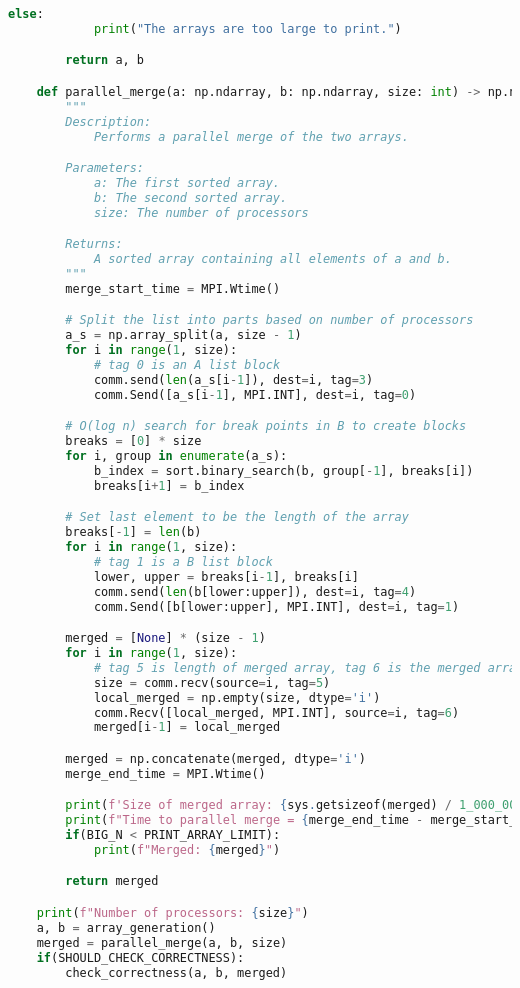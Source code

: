 \documentclass[12pt]{article}
\begin{document}
{\begin{lstlisting}[language={Python}]
        else:
            print("The arrays are too large to print.")

        return a, b

    def parallel_merge(a: np.ndarray, b: np.ndarray, size: int) -> np.ndarray:
        """
        Description:
            Performs a parallel merge of the two arrays.

        Parameters:
            a: The first sorted array.
            b: The second sorted array.
            size: The number of processors

        Returns:
            A sorted array containing all elements of a and b.
        """
        merge_start_time = MPI.Wtime()

        # Split the list into parts based on number of processors
        a_s = np.array_split(a, size - 1)
        for i in range(1, size):
            # tag 0 is an A list block
            comm.send(len(a_s[i-1]), dest=i, tag=3)
            comm.Send([a_s[i-1], MPI.INT], dest=i, tag=0)

        # O(log n) search for break points in B to create blocks
        breaks = [0] * size
        for i, group in enumerate(a_s):
            b_index = sort.binary_search(b, group[-1], breaks[i])
            breaks[i+1] = b_index

        # Set last element to be the length of the array
        breaks[-1] = len(b)
        for i in range(1, size):
            # tag 1 is a B list block
            lower, upper = breaks[i-1], breaks[i]
            comm.send(len(b[lower:upper]), dest=i, tag=4)
            comm.Send([b[lower:upper], MPI.INT], dest=i, tag=1)

        merged = [None] * (size - 1)
        for i in range(1, size):
            # tag 5 is length of merged array, tag 6 is the merged array
            size = comm.recv(source=i, tag=5)
            local_merged = np.empty(size, dtype='i')
            comm.Recv([local_merged, MPI.INT], source=i, tag=6)
            merged[i-1] = local_merged

        merged = np.concatenate(merged, dtype='i')
        merge_end_time = MPI.Wtime()

        print(f'Size of merged array: {sys.getsizeof(merged) / 1_000_000: ,.2f} MB')
        print(f"Time to parallel merge = {merge_end_time - merge_start_time: .4f} seconds")
        if(BIG_N < PRINT_ARRAY_LIMIT):
            print(f"Merged: {merged}")

        return merged

    print(f"Number of processors: {size}")
    a, b = array_generation()
    merged = parallel_merge(a, b, size)
    if(SHOULD_CHECK_CORRECTNESS):
        check_correctness(a, b, merged)



\end{lstlisting}}
\end{document}
